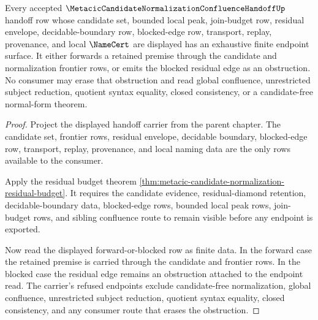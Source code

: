 \begin{theorem}
\label{thm:metacic-normal-form-residual-budget-exhaustion}
Every accepted $\MetacicCandidateNormalizationConfluenceHandoffUp$ handoff row
whose candidate set, bounded local peak, join-budget row, residual envelope,
decidable-boundary row, blocked-edge row, transport, replay, provenance, and
local $\NameCert$ are displayed has an exhaustive finite endpoint surface. It
either forwards a retained premise through the candidate and normalization
frontier rows, or emits the blocked residual edge as an obstruction. No
consumer may erase that obstruction and read global confluence, unrestricted
subject reduction, quotient syntax equality, closed consistency, or a
candidate-free normal-form theorem.
\end{theorem}
\begin{proof}
Project the displayed handoff carrier from the parent chapter. The candidate
set, frontier rows, residual envelope, decidable boundary, blocked-edge row,
transport, replay, provenance, and local naming data are the only rows available
to the consumer.

Apply the residual budget theorem
\autoref{thm:metacic-candidate-normalization-residual-budget}. It requires the
candidate evidence, residual-diamond retention, decidable-boundary data,
blocked-edge rows, bounded local peak rows, join-budget rows, and sibling
confluence route to remain visible before any endpoint is exported.

Now read the displayed forward-or-blocked row as finite data. In the forward
case the retained premise is carried through the candidate and frontier rows. In
the blocked case the residual edge remains an obstruction attached to the
endpoint read. The carrier's refused endpoints exclude candidate-free
normalization, global confluence, unrestricted subject reduction, quotient
syntax equality, closed consistency, and any consumer route that erases the
obstruction.
\end{proof}


